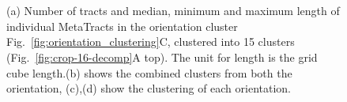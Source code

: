 \begin{figure}[h]
\centering
{}\\
\\
\caption{(a) Number of tracts and median, minimum and maximum length of individual MetaTracts in the orientation cluster Fig.~\ref{fig:orientation_clustering}C, clustered into 15 clusters (Fig.~\ref{fig:crop-16-decomp}A top). The unit for length is the grid cube length.(b) shows the combined clusters from both the orientation, (c),(d) show the clustering of each orientation.}
\label{fig:radius_3}
\end{figure}